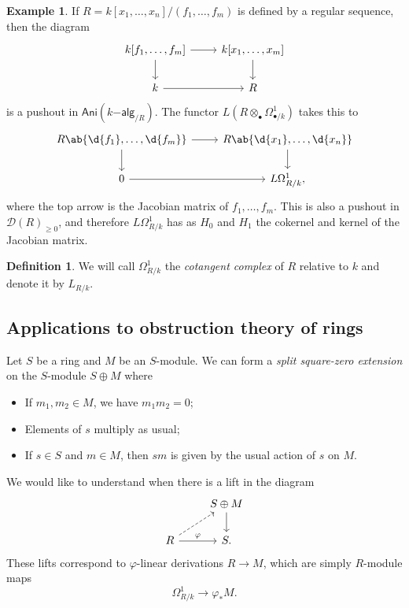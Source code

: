 \documentclass[10pt]{amsart}
\theoremstyle{definition}
\newtheorem{defn}[thm]{Definition}
\newtheorem{exm}[thm]{Example}
\theoremstyle{remark}
\theoremstyle{plain}
\theoremstyle{definition}
\theoremstyle{remark}
\newcommand{\mc}[1]{\mathcal{#1}}
\newcommand{\ms}[1]{\mathsf{#1}}
\newcommand{\1}{\mathbf{1}}
\newcommand{\2}{\mathbf{2}}
\newcommand{\3}{\mathbf{3}}
\begin{document}
\begin{exm}
    If $R = k[x_1, \ldots, x_n] / (f_1, \ldots, f_m)$ is defined by a regular sequence, then the diagram
    \begin{equation*}
    \begin{tikzcd}
        k[f_1, \ldots, f_m] \ar{r} \ar{d} & k[x_1, \ldots, x_m] \ar{d} \\
        k \ar{r} & R
    \end{tikzcd}
    \end{equation*}
    is a pushout in $\ms{Ani}(k\ms{-alg}_{/R})$. The functor $L(R \otimes_{\bullet} \Omega^1_{\bullet/k})$ takes this to
    \begin{equation*}
    \begin{tikzcd}
        R\ab\{\d{f_1}, \ldots, \d{f_m} \}  \ar{r} \ar{d} & R \ab\{ \d{x_1}, \ldots, \d{x_n}\} \ar{d} \\
         0 \ar{r} & L \Omega^1_{R/k},
    \end{tikzcd}
    \end{equation*}
    where the top arrow is the Jacobian matrix of $f_1, \ldots, f_m$. This is also a pushout in $\mc{D}(R)_{\geq 0}$, and therefore $L\Omega^1_{R/k}$ has as $H_0$ and $H_1$ the cokernel and kernel of the Jacobian matrix.
\end{exm}

\begin{defn}
    We will call $\Omega^1_{R/k}$ the \textit{cotangent complex} of $R$ relative to $k$ and denote it by $L_{R/k}$.
\end{defn}

\subsection{Applications to obstruction theory of rings}%
\label{sub:Applications to obstruction theory of rings}

Let $S$ be a ring and $M$ be an $S$-module. We can form a \textit{split square-zero extension} on the $S$-module $S \oplus M$ where
\begin{itemize}
    \item If $m_1, m_2 \in M$, we have $m_1 m_2 = 0$;
    \item Elements of $s$ multiply as usual;
    \item If $s \in S$ and $m \in M$, then $sm$ is given by the usual action of $s$ on $M$.
\end{itemize}
We would like to understand when there is a lift in the diagram
\begin{equation*}
\begin{tikzcd}
    & S \oplus M \ar{d} \\
    R \ar{r}{\varphi} \ar[dashrightarrow]{ur} & S.
\end{tikzcd}
\end{equation*}
These lifts correspond to $\varphi$-linear derivations $R \to M$, which are simply $R$-module maps
\[ \Omega^1_{R/k} \to \varphi_* M. \]
\end{document}
